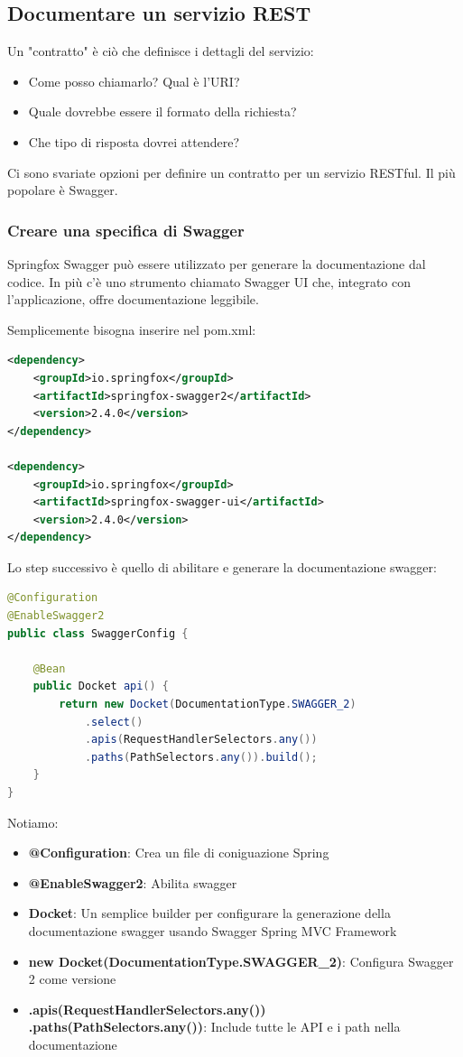 \documentclass[11pt,a4paper]{book}
\begin{document}
\subsection{Documentare un servizio REST}
Un "contratto" è ciò che definisce i dettagli del servizio:
\begin{itemize}
	\item Come posso chiamarlo? Qual è l'URI?
	\item Quale dovrebbe essere il formato della richiesta?
	\item Che tipo di risposta dovrei attendere?
\end{itemize}
Ci sono svariate opzioni per definire un contratto per un servizio RESTful. Il più popolare è Swagger. 

\subsubsection{Creare una specifica di Swagger}
Springfox Swagger può essere utilizzato per generare la documentazione dal codice. In più c'è uno strumento chiamato Swagger UI che, integrato con l'applicazione, offre documentazione leggibile.

Semplicemente bisogna inserire nel pom.xml:
\begin{lstlisting}[language = XML]
<dependency>
	<groupId>io.springfox</groupId>
	<artifactId>springfox-swagger2</artifactId>
	<version>2.4.0</version>
</dependency>

<dependency>
	<groupId>io.springfox</groupId>
	<artifactId>springfox-swagger-ui</artifactId>
	<version>2.4.0</version>
</dependency>
\end{lstlisting}
Lo step successivo è quello di abilitare e generare la documentazione swagger:
\begin{lstlisting}[language = Java]
@Configuration
@EnableSwagger2
public class SwaggerConfig {

	@Bean
	public Docket api() {
		return new Docket(DocumentationType.SWAGGER_2)
			.select()
			.apis(RequestHandlerSelectors.any())
			.paths(PathSelectors.any()).build();
	}
}
\end{lstlisting}

Notiamo:
\begin{itemize}
	\item \textbf{@Configuration}: Crea un file di coniguazione Spring
	\item \textbf{@EnableSwagger2}: Abilita swagger
	\item \textbf{Docket}: Un semplice builder per configurare la generazione della documentazione swagger usando Swagger Spring MVC Framework
	\item \textbf{new Docket(DocumentationType.SWAGGER\_2)}: Configura Swagger 2 come versione
	\item \textbf{.apis(RequestHandlerSelectors.any())\\
		.paths(PathSelectors.any())}: Include tutte le API e i path nella documentazione
\end{itemize}
\end{document}
